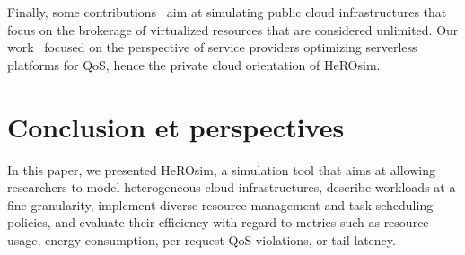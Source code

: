 Finally, some contributions~\cite{nunez_icancloud_2012, mahmoudiSimFaaSPerformanceSimulator2021} aim at simulating public cloud infrastructures that focus on the brokerage of virtualized resources that are considered unlimited. Our work~\cite{herofake, herocache} focused on the perspective of service providers optimizing serverless platforms for QoS, hence the private cloud orientation of HeROsim.


\section{Conclusion et perspectives}
\label{section:herosim-conclusion}

In this paper, we presented HeROsim, a simulation tool that aims at allowing researchers to model heterogeneous cloud infrastructures, describe workloads at a fine granularity, implement diverse resource management and task scheduling policies, and evaluate their efficiency with regard to metrics such as resource usage, energy consumption, per-request QoS violations, or tail latency. %


